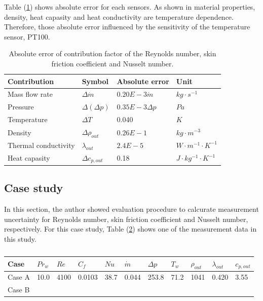 \documentclass[12pt,oneside]{jbook}
\begin{document}
Table (\ref{absolute_error}) shows absolute error for each sensors.
As shown in material properties, density, heat capasity and heat conductivity are temperature dependence.
Therefore, those absolute error influenced by the sensitivity of the temperature sensor, PT100.
\begin{table}[h]
\centering
\caption{Absolute error of contribution factor of the Reynolds number, skin friction coefficient and Nusselt number.}
\vspace{1zh}
\label{absolute_error}
\begin{tabular}{llll} \toprule%
{Contribution} & {Symbol}          & {Absolute error}   & {Unit}\\ \midrule
Mass flow rate & $\Delta \dot{m}$  & $0.20E-3\dot{m}$   & $kg\cdot s^{-1}$\\
Pressure       & $\Delta(\Delta p)$& $0.35E-3\Delta p$  & $Pa$\\
Temperature    & $\Delta T$        & 0.040              & $K$\\
Density        & $\Delta \rho_{out}$& $0.26E-1$         & $kg\cdot m^{-3}$\\
Thermal conductivity & $\lambda_{out}$& $2.4E-5$        & $W\cdot m^{-1}\cdot K^{-1}$\\
Heat capasity  & $\Delta c_{p,out}$& 0.18               & $J\cdot kg^{-1}\cdot K^{-1}$\\
\bottomrule
\end{tabular}
\end{table}

\clearpage
\subsection{Case study}
In this section, the author showed evaluation procedure to calcurate measurement uncertainty for Reynolds number, skin friction coefficient and Nusselt number, respectively.
For this case study, Table (\ref{case_study}) shows one of the measurement data in this study.

\begin{table}[h]
\centering
\caption{}
\vspace{1zh}
\label{case_study}
\begin{tabular}{lllllllllll} \toprule%
{Case} & {$Pr_{w}$} & {$Re$}  & {$C_{f}$} & {$Nu$} & {$\dot{m}$} & {$\Delta p$} & {$T_{w}$} & {$\rho_{out}$} & {$\lambda_{out}$} & $c_{p,out}$\\ \midrule
Case A & 10.0 & 4100 & 0.0103 & 38.7 & 0.044 & 253.8 & 71.2 & 1041 & 0.420 & 3.55\\
Case B &&&&&&&&&&\\
\bottomrule
\end{tabular}
\end{table}
\end{document}

